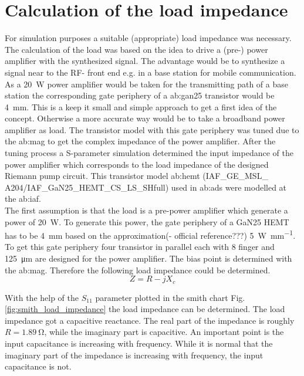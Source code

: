 \section{Calculation of the load impedance}
For simulation purposes a suitable (appropriate) load impedance was necessary. 
The calculation of the load was based on the idea to drive a (pre-) power amplifier with the synthesized signal.
The advantage would be to synthesize a signal near to the RF- front end e.g. in a base station for mobile communication.
As a \SI{20}{\watt} power amplifier would be taken for the transmitting path of a base station the corresponding gate periphery of a \gls{ab:gan}25 transistor would be \SI{4}{\milli \metre}.
This is a keep it small and simple approach to get a first idea of the concept. Otherwise a more accurate way would be to take a broadband power amplifier as load.
The transistor model with this gate periphery was tuned due to the \gls{ab:mag} to get the complex impedance of the power amplifier.
After the tuning process a S-parameter simulation determined the input impedance of the power amplifier which corresponds to the load impedance of the designed Riemann pump circuit.
This transistor model \gls{ab:hemt} (IAF\_GE\_MSL\_ A204/IAF\_GaN25\_HEMT\_CS\_LS\_SHfull) used in \gls{ab:ads} were modelled at the \gls{ab:iaf}.\\

 The first assumption is that the load is a pre-power amplifier which generate a power of \SI{20}{\watt}. To generate this power, the gate periphery of a GaN25 HEMT has to be \SI{4}{\milli \metre} based on the approximation(- official reference???) \SI[per-mode=fraction]{5}{\watt\per\milli\metre}. To get this gate periphery four transistor in parallel each with 8 finger and \SI{125}{\micro \metre} are designed for the power amplifier. The bias point is determined with the \gls{ab:mag}. Therefore the following load impedance could be determined.
\begin{equation}
Z = R - jX_c
\end{equation}

With the help of the $S_{11}$ parameter plotted in the smith chart Fig. \ref{fig:smith_load_impedance} the load impedance can be determined.
The load impedance got a capacitive reactance.
 The real part of the impedance is roughly $R = \SI{1.89}{\ohm}$, while the imaginary part is capacitive. An important point is the input capacitance is increasing with frequency. While it is normal that the imaginary part of the impedance is increasing with frequency, the input capacitance is not.

